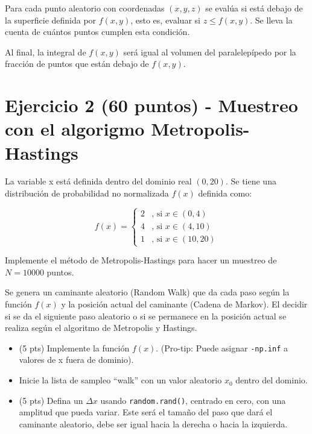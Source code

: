 \documentclass{article}
\begin{document}
Para cada punto aleatorio con coordenadas $(x,y,z)$ se evalúa si está debajo de la
superficie definida por $f(x,y)$, esto es, evaluar si  $z \leq f(x,y)$. Se lleva la
cuenta de cuántos puntos cumplen esta condición.

Al final, la integral de $f(x,y)$ será igual al volumen del paralelepípedo por la fracción
de puntos que están debajo de $f(x,y)$.


\section{Ejercicio 2 (60 puntos) - Muestreo con el algorigmo Metropolis-Hastings}

La variable x está definida dentro del dominio real $(0,20)$.
Se tiene una distribución de probabilidad no normalizada $f(x)$ definida como:

\begin{equation}
  f(x) = \begin{cases}
    2 & \text{, si } x \in (0,4)\\
    4 & \text{, si } x \in (4,10)\\
    1 & \text{, si } x \in (10,20)
  \end{cases}
\end{equation}

Implemente el método de Metropolis-Hastings para hacer un muestreo de $N=10000$ puntos.

Se genera un caminante aleatorio (Random Walk) que da cada paso según la función $f(x)$ y la posición
actual del caminante (Cadena de Markov). El decidir si se da el siguiente paso aleatorio
o si se permanece en la posición actual se realiza según el algoritmo de Metropolis y Hastings. 


\begin{itemize}
\item (5 pts) Implemente la función $f(x)$. (Pro-tip: Puede asignar \texttt{-np.inf} a valores
  de x fuera de dominio).
\item Inicie la lista de sampleo ``walk'' con un valor aleatorio $x_0$ dentro del dominio.
\item (5 pts) Defina un $\Delta x$ usando \texttt{random.rand()}, centrado en cero, con una amplitud
  que pueda variar. Este será el tamaño del paso que dará el caminante aleatorio, debe ser
  igual hacia la derecha o hacia la izquierda.
\end{itemize}
\end{document}
